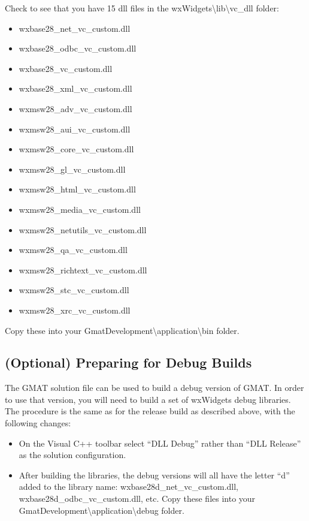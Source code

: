 \documentclass[letterpaper,10pt]{article}%
\begin{document}
{\noindent Check to see that you have 15 dll files in the wxWidgets\textbackslash lib\textbackslash vc\_dll folder:
{\begin{itemize}\setlength{\itemsep}{0pt}
\item wxbase28\_net\_vc\_custom.dll
\item wxbase28\_odbc\_vc\_custom.dll
\item wxbase28\_vc\_custom.dll
\item wxbase28\_xml\_vc\_custom.dll
\item wxmsw28\_adv\_vc\_custom.dll
\item wxmsw28\_aui\_vc\_custom.dll
\item wxmsw28\_core\_vc\_custom.dll
\item wxmsw28\_gl\_vc\_custom.dll
\item wxmsw28\_html\_vc\_custom.dll
\item wxmsw28\_media\_vc\_custom.dll
\item wxmsw28\_netutils\_vc\_custom.dll
\item wxmsw28\_qa\_vc\_custom.dll
\item wxmsw28\_richtext\_vc\_custom.dll
\item wxmsw28\_stc\_vc\_custom.dll
\item wxmsw28\_xrc\_vc\_custom.dll
\end{itemize}}

\noindent Copy these into your GmatDevelopment\textbackslash application\textbackslash bin folder.

\subsection{(Optional) Preparing for Debug Builds}

The GMAT solution file can be used to build a debug version of GMAT.  In order to use that version, you will need to build a set of wxWidgets debug libraries.  The procedure is the same as for the release build as described above, with the following changes:

\begin{itemize}
\item On the Visual C++ toolbar select ``DLL Debug'' rather than ``DLL Release'' as the solution configuration.
\item After building the libraries, the debug versions will all have the letter ``d'' added to the library name: wxbase28d\_net\_vc\_custom.dll, wxbase28d\_odbc\_vc\_custom.dll, etc.  Copy these files into your GmatDevelopment\textbackslash application\textbackslash debug folder.
\end{itemize}

}
\end{document}
